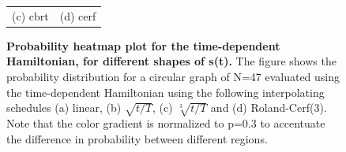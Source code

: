 \begin{figure}[ht]
\begin{tabular}{cc}
(c) cbrt & (d) cerf\\[6pt]
\end{tabular}
\caption[Probability heatmap plot for the time-dependent Hamiltonian, for different shapes of s(t)]{\textbf{Probability heatmap plot for the time-dependent Hamiltonian, for different shapes of s(t).} The figure shows the probability distribution for a circular graph of N=47 evaluated using the time-dependent Hamiltonian using the following interpolating schedules (a) linear, (b) $\sqrt{t/T}$, (c) $\sqrt[3]{t/T}$ and (d) Roland-Cerf(3). Note that the color gradient is normalized to p=0.3 to accentuate the difference in probability between different regions. }
\label{fig:heatmap-dependent}
\end{figure}
